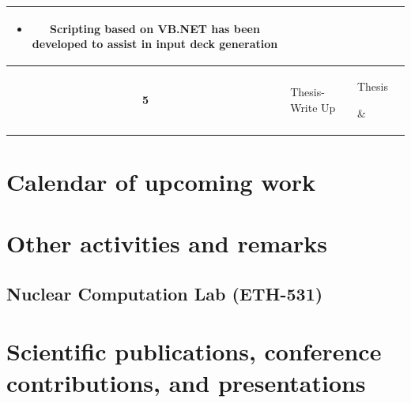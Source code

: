 \documentclass[11pt,titlepage]{article}
\begin{document}
\begin{table}[h!]
\begin{center}
\begin{tabular}{c l l l}
{\begin{itemize}[leftmargin=1em,itemsep=1pt,parsep=0pt]
						\item Scripting based on VB.NET has been developed to assist in input deck generation
					\end{itemize}}\\ \hline
				\textbf{5} 
				& \parbox[c]{0.2\textwidth}{
					Thesis-Write Up}
				& \parbox[c]{0.2\textwidth}{%
					Thesis} 
				& \\ 
			\bottomrule[1.5pt]
		\end{tabular}
	\end{center}
\end{table}
				
				
\section{Calendar of upcoming work}

\section{Other activities and remarks}

\subsection{Nuclear Computation Lab (ETH-531)}

\section{Scientific publications, conference contributions, and presentations}

\nocite{Wicaksono2014a}
\nocite{Wicaksono2014b}
\nocite{Wicaksono2015a}
\nocite{Wicaksono2015b}
\nocite{Wicaksono2015c}

\printbibliography[heading=none]
\end{document}
